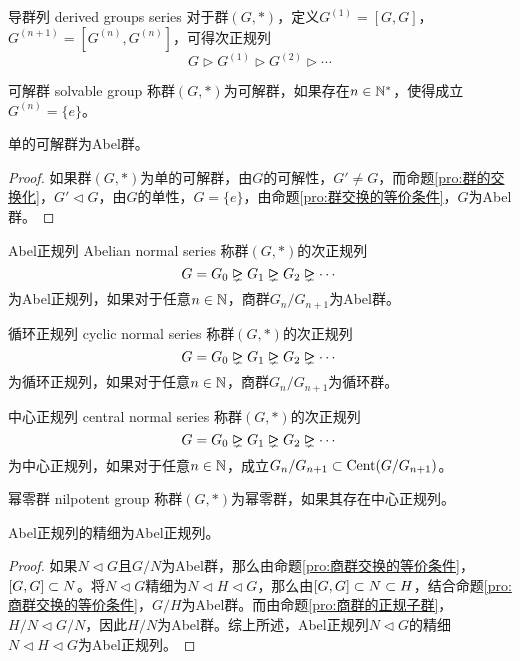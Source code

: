 \begin{definition}{导群列 derived groups series}
	对于群$(G,*)$，定义$G^{(1)}=[G,G]$，$G^{(n+1)}=[G^{(n)},G^{(n)}]$，可得次正规列
	$$
	G\rhd G^{(1)}\rhd G^{(2)}\rhd \cdots
	$$
\end{definition}

\begin{definition}{可解群 solvable group}
	称群$(G,*)$为可解群，如果存在$n\in\mathbb{N}^*$，使得成立$G^{(n)}=\{e\}$。
\end{definition}

\begin{proposition}
	单的可解群为Abel群。
\end{proposition}

\begin{proof}
	如果群$(G,*)$为单的可解群，由$G$的可解性，$G'\ne G$，而命题\ref{pro:群的交换化}，$G'\lhd G$，由$G$的单性，$G=\{e\}$，由命题\ref{pro:群交换的等价条件}，$G$为Abel群。
\end{proof}

\begin{definition}{Abel正规列 Abelian normal series }
	称群$(G,*)$的次正规列
	$$
	G=G_0\rhdneq G_1\rhdneq G_2\rhdneq \cdots
	$$
	为Abel正规列，如果对于任意$n\in\mathbb{N}$，商群$G_{n}/G_{n+1}$为Abel群。
\end{definition}

\begin{definition}{循环正规列 cyclic normal series}
	称群$(G,*)$的次正规列
	$$
	G=G_0\rhdneq G_1\rhdneq G_2\rhdneq \cdots
	$$
	为循环正规列，如果对于任意$n\in\mathbb{N}$，商群$G_{n}/G_{n+1}$为循环群。
\end{definition}

\begin{definition}{中心正规列 central normal series}
	称群$(G,*)$的次正规列
	$$
	G=G_0\rhdneq G_1\rhdneq G_2\rhdneq \cdots
	$$
	为中心正规列，如果对于任意$n\in\mathbb{N}$，成立$G_{n}/G_{n+1}\subset\mathrm{Cent}(G/G_{n+1})$。
\end{definition}

\begin{definition}{幂零群 nilpotent group}
	称群$(G,*)$为幂零群，如果其存在中心正规列。
\end{definition}

\begin{proposition}
	Abel正规列的精细为Abel正规列。
\end{proposition}

\begin{proof}
	如果$N\lhd G$且$G/N$为Abel群，那么由命题\ref{pro:商群交换的等价条件}，$[G,G]\subset N$。将$N\lhd G$精细为$N\lhd H\lhd G$，那么由$[G,G]\subset N\subset H$，结合命题\ref{pro:商群交换的等价条件}，$G/H$为Abel群。而由命题\ref{pro:商群的正规子群}，$H/N\lhd G/N$，因此$H/N$为Abel群。综上所述，Abel正规列$N\lhd G$的精细$N\lhd H\lhd G$为Abel正规列。
\end{proof}

